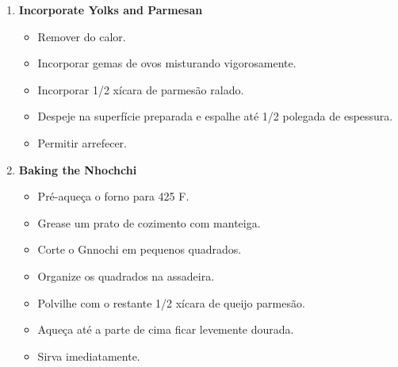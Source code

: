 \documentclass [11pt, letterpaper] {article}
\newcommand \fileName {GnocchiAllaRomana}
\begin{document}
\begin {description}
\begin {enumerate}
\item {\bf Incorporate Yolks and Parmesan}
\begin {itemize}
\item Remover do calor.
\item Incorporar gemas de ovos misturando vigorosamente.
\item Incorporar 1/2 xícara de parmesão ralado.
\item Despeje na superfície preparada e espalhe até 1/2 polegada de espessura.
\item Permitir arrefecer.
\end {itemize}

\item {\bf Baking the Nhochchi}
\begin {itemize}
\item Pré-aqueça o forno para 425 F.
\item Grease um prato de cozimento com manteiga.
\item Corte o Gnnochi em pequenos quadrados.
\item Organize os quadrados na assadeira.
\item Polvilhe com o restante 1/2 xícara de queijo parmesão.
\item Aque\c{c}a até a parte de cima ficar levemente dourada.
\item Sirva imediatamente.
\end {itemize}

\end {enumerate}
\end {description}

\end{document}
